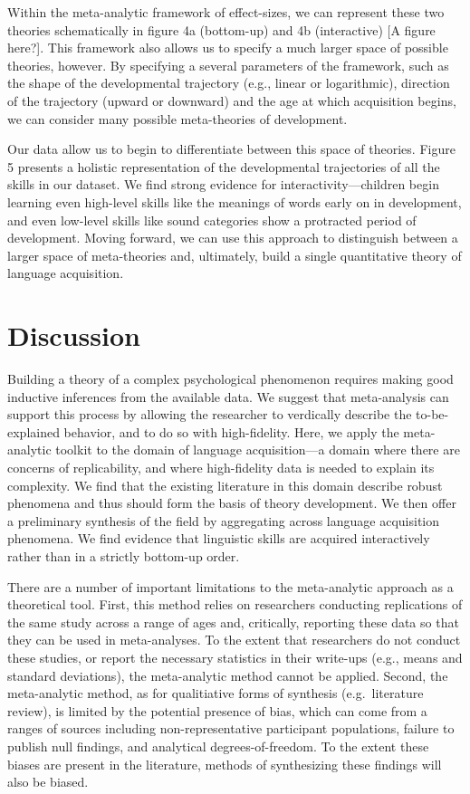 \documentclass[english,floatsintext,man]{apa6}
\begin{document}
Within the meta-analytic framework of effect-sizes, we can represent
these two theories schematically in figure 4a (bottom-up) and 4b
(interactive) {[}A figure here?{]}. This framework also allows us to
specify a much larger space of possible theories, however. By specifying
a several parameters of the framework, such as the shape of the
developmental trajectory (e.g., linear or logarithmic), direction of the
trajectory (upward or downward) and the age at which acquisition begins,
we can consider many possible meta-theories of development.

Our data allow us to begin to differentiate between this space of
theories. Figure 5 presents a holistic representation of the
developmental trajectories of all the skills in our dataset. We find
strong evidence for interactivity---children begin learning even
high-level skills like the meanings of words early on in development,
and even low-level skills like sound categories show a protracted period
of development. Moving forward, we can use this approach to distinguish
between a larger space of meta-theories and, ultimately, build a single
quantitative theory of language acquisition.

\section{Discussion}\label{discussion}

Building a theory of a complex psychological phenomenon requires making
good inductive inferences from the available data. We suggest that
meta-analysis can support this process by allowing the researcher to
verdically describe the to-be-explained behavior, and to do so with
high-fidelity. Here, we apply the meta-analytic toolkit to the domain of
language acquisition---a domain where there are concerns of
replicability, and where high-fidelity data is needed to explain its
complexity. We find that the existing literature in this domain describe
robust phenomena and thus should form the basis of theory development.
We then offer a preliminary synthesis of the field by aggregating across
language acquisition phenomena. We find evidence that linguistic skills
are acquired interactively rather than in a strictly bottom-up order.

There are a number of important limitations to the meta-analytic
approach as a theoretical tool. First, this method relies on researchers
conducting replications of the same study across a range of ages and,
critically, reporting these data so that they can be used in
meta-analyses. To the extent that researchers do not conduct these
studies, or report the necessary statistics in their write-ups (e.g.,
means and standard deviations), the meta-analytic method cannot be
applied. Second, the meta-analytic method, as for qualitiative forms of
synthesis (e.g.~literature review), is limited by the potential presence
of bias, which can come from a ranges of sources including
non-representative participant populations, failure to publish null
findings, and analytical degrees-of-freedom. To the extent these biases
are present in the literature, methods of synthesizing these findings
will also be biased.
\end{document}

